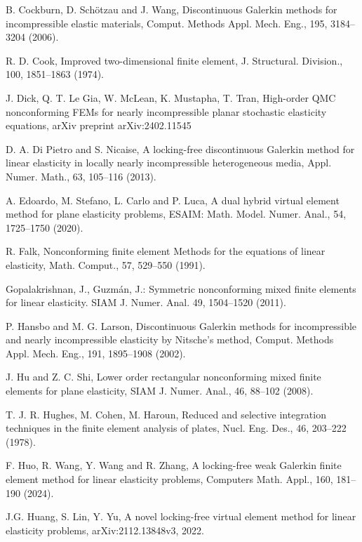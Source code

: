 \documentclass[11pt]{article}
\numberwithin{equation}{section}
\begin{document}
\begin{thebibliography}{99.}
 B. Cockburn, D. Schötzau and J. Wang, Discontinuous Galerkin methods for incompressible elastic materials, Comput. Methods Appl. Mech. Eng., 195, 3184--3204 (2006).

 R. D. Cook,  Improved two-dimensional finite element, J. Structural. Division., 100, 1851--1863 (1974).

 J. Dick, Q. T. Le  Gia, W. McLean, K. Mustapha, T. Tran, High-order QMC nonconforming FEMs for nearly incompressible planar stochastic elasticity equations, arXiv preprint arXiv:2402.11545

 D. A.  Di Pietro and S. Nicaise, A locking-free discontinuous Galerkin method for linear elasticity in locally nearly incompressible heterogeneous media, Appl. Numer. Math., 63, 105--116 (2013).

 A. Edoardo, M. Stefano, L. Carlo and P. Luca,  A dual hybrid virtual element method for plane elasticity problems, ESAIM: Math. Model. Numer. Anal., 54, 1725--1750 (2020).

 R. Falk, Nonconforming finite element Methods for the equations of linear elasticity, Math. Comput., 57, 529--550 (1991).

 Gopalakrishnan, J., Guzmán, J.: Symmetric nonconforming mixed finite elements for linear elasticity. SIAM J. Numer. Anal. 49, 1504–1520 (2011).

 P. Hansbo and  M. G. Larson, Discontinuous Galerkin methods for incompressible and nearly incompressible elasticity by Nitsche’s method, Comput. Methods Appl. Mech. Eng., 191, 1895--1908 (2002).

 J. Hu and Z. C.  Shi,  Lower order rectangular nonconforming mixed finite elements for plane elasticity, SIAM J. Numer. Anal., 46, 88--102 (2008).

  T. J. R. Hughes, M. Cohen, M. Haroun, Reduced and selective integration techniques in the finite element analysis of plates, Nucl. Eng. Des., 46, 203--222 (1978).

  F. Huo, R. Wang, Y. Wang and R. Zhang, A locking-free weak Galerkin finite element method for linear elasticity problems,  Computers   Math. Appl., 160, 181--190 (2024).

  J.G. Huang, S. Lin, Y. Yu, A novel locking-free virtual element method for linear elasticity problems, arXiv:2112.13848v3, 2022.


\end{thebibliography}
\end{document}
